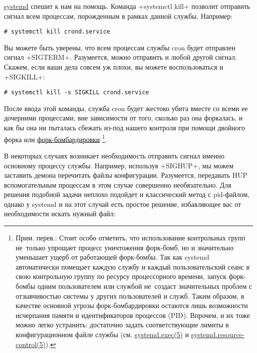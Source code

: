 \documentclass[10pt,oneside,a4paper]{article}
\begin{document}
\href{http://www.freedesktop.org/wiki/Software/systemd}{systemd} спешит к нам
на помощь. Команда +systemctl kill+ позволит отправить сигнал всем
процессам, порожденным в рамках данной службы. Например: 

\begin{Verbatim}
# systemctl kill crond.service
\end{Verbatim}

Вы можете быть уверены, что всем процессам службы cron будет отправлен сигнал
+SIGTERM+. Разумеется, можно отправить и любой другой сигнал. Скажем, если ваши
дела совсем уж плохи, вы можете воспользоваться и +SIGKILL+: 

\begin{Verbatim}
# systemctl kill -s SIGKILL crond.service
\end{Verbatim}

После ввода этой команды, служба cron будет жестоко убита вместе со всеми ее
дочерними процессами, вне зависимости от того, сколько раз она форкалась, и
как бы она ни пыталась сбежать из-под нашего контроля при помощи двойного
форка или
\href{http://ru.wikipedia.org/wiki/Fork-%D0%B1%D0%BE%D0%BC%D0%B1%D0%B0}{форк-бомбардировки}%
\footnote{Прим. перев.: Стоит особо отметить, что использование контрольных
групп не~только упрощает процесс уничтожения форк-бомб, но и значительно
уменьшает ущерб от работающей форк-бомбы. Так как systemd автоматически помещает
каждую службу и каждый пользовательский сеанс в свою контрольную группу по
ресурсу процессорного времени, запуск форк-бомбы одним пользователем или службой
не~создаст значительных проблем с отзывчивостью системы у других пользователей и
служб. Таким образом, в качестве основной угрозы форк-бомбардировки остаются
лишь возможности исчерпания памяти и идентификаторов процессов (PID). Впрочем, и
их тоже можно легко устранить: достаточно задать соответствующие лимиты в
конфигурационном файле службы (см.
\href{http://www.freedesktop.org/software/systemd/man/systemd.exec.html}%
{systemd.exec(5)} и
\href{http://www.freedesktop.org/software/systemd/man/systemd.resource-control.html}%
{systemd.resource-control(5)}).}.

В некоторых случаях возникает необходимость отправить сигнал именно основному
процессу службы. Например, используя +SIGHUP+, мы можем заставить демона
перечитать файлы конфигурации. Разумеется, передавать HUP вспомогательным
процессам в этом случае совершенно необязательно. Для решения подобной задачи
неплохо подойдет и классический метод с pid-файлом, однако у systemd и на этот
случай есть простое решение, избавляющее вас от необходимости искать нужный
файл: 
\end{document}
